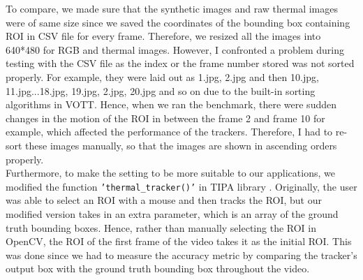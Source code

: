 \documentclass[conference]{IEEEtran}
\begin{document}
To compare, we made sure that the synthetic images and raw thermal images were of same size since we saved the coordinates of the bounding box containing ROI in CSV file for every frame. Therefore, we resized all the images into 640*480 for RGB and thermal images. However, I confronted a problem during testing with the CSV file as the index or the frame number stored was not sorted properly. For example, they were laid out as 1.jpg, 2.jpg and then 10.jpg, 11.jpg...18.jpg, 19.jpg, 2.jpg, 20.jpg and so on due to the built-in sorting algorithms in VOTT. Hence, when we ran the benchmark, there were sudden changes in the motion of the ROI in between the frame 2 and frame 10 for example, which affected the performance of the trackers. Therefore, I had to re-sort these images manually, so that the images are shown in ascending orders properly. \\
Furthermore, to make the setting to be more suitable to our applications, we modified the function
\verb|’thermal_tracker()’| in TIPA library \cite{b7}. Originally, the user was able to select an ROI with a mouse and then tracks the ROI, but our modified version takes in an extra parameter, which is an array of the ground truth bounding boxes. Hence, rather than manually selecting the ROI in OpenCV, the ROI of the first frame of the video takes it as the initial ROI. This was done since we had to measure the accuracy metric by comparing the tracker’s output box with the ground truth bounding box throughout the video. \\
\end{document}
